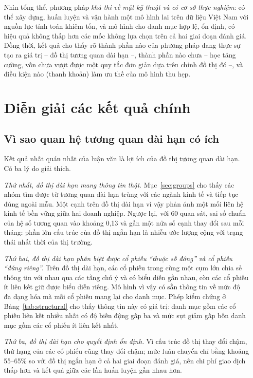 Nhìn tổng thể, phương pháp \emph{khả thi về mặt kỹ thuật và có cơ sở thực nghiệm}: có thể xây dựng, huấn luyện và vận hành một mô hình lai trên dữ liệu Việt Nam với nguồn lực tính toán khiêm tốn, và mô hình cho danh mục hợp lệ, ổn định, có hiệu quả không thấp hơn các mốc không lựa chọn trên cả hai giai đoạn đánh giá. Đồng thời, kết quả cho thấy rõ thành phần nào của phương pháp đang thực sự tạo ra giá trị -- đồ thị tương quan dài hạn --, thành phần nào chưa -- học tăng cường, vốn chưa vượt được một quy tắc đơn giản dựa trên chính đồ thị đó --, và điều kiện nào (thanh khoản) làm ưu thế của mô hình thu hẹp.

\section{Diễn giải các kết quả chính}

\subsection{Vì sao quan hệ tương quan dài hạn có ích}

Kết quả nhất quán nhất của luận văn là lợi ích của đồ thị tương quan dài hạn. Có ba lý do giải thích.

\textit{Thứ nhất, đồ thị dài hạn mang thông tin thật.} Mục~\ref{sec:groups} cho thấy các nhóm tìm được từ tương quan dài hạn trùng với các ngành kinh tế và tiếp tục đúng ngoài mẫu. Một cạnh trên đồ thị dài hạn vì vậy phản ánh một mối liên hệ kinh tế bền vững giữa hai doanh nghiệp. Ngược lại, với 60 quan sát, sai số chuẩn của hệ số tương quan vào khoảng 0,13 và gần một nửa số cạnh thay đổi sau mỗi tháng: phần lớn cấu trúc của đồ thị ngắn hạn là nhiễu ước lượng cộng với trạng thái nhất thời của thị trường.

\textit{Thứ hai, đồ thị dài hạn phân biệt được cổ phiếu ``thuộc số đông'' và cổ phiếu ``đứng riêng''.} Trên đồ thị dài hạn, các cổ phiếu trong cùng một cụm lớn chia sẻ thông tin với nhau qua các tầng chú ý và có biểu diễn gần nhau, còn các cổ phiếu ít liên kết giữ được biểu diễn riêng. Mô hình vì vậy có sẵn thông tin về mức độ đa dạng hóa mà mỗi cổ phiếu mang lại cho danh mục. Phép kiểm chứng ở Bảng~\ref{tab:structural} cho thấy thông tin này có giá trị: danh mục gồm các cổ phiếu liên kết nhiều nhất có độ biến động gấp ba và mức sụt giảm gấp bốn danh mục gồm các cổ phiếu ít liên kết nhất.

\textit{Thứ ba, đồ thị dài hạn cho quyết định ổn định.} Vì cấu trúc đồ thị thay đổi chậm, thứ hạng của các cổ phiếu cũng thay đổi chậm; mức luân chuyển chỉ bằng khoảng 55--65\% so với đồ thị ngắn hạn ở cả hai giai đoạn đánh giá, nên chi phí giao dịch thấp hơn và kết quả giữa các lần huấn luyện gần nhau hơn.


